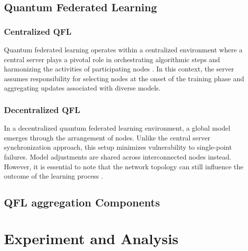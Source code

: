 \subsection{Quantum Federated Learning}
\subsubsection{Centralized QFL}
Quantum federated learning operates within a centralized environment where a central server plays a pivotal role in orchestrating algorithmic steps and harmonizing the activities of participating nodes \cite{pujahari2022quantum}. In this context, the server assumes responsibility for selecting nodes at the onset of the training phase and aggregating updates associated with diverse models.
\subsubsection{Decentralized QFL}

In a decentralized quantum federated learning environment, a global model emerges through the arrangement of nodes. Unlike the central server synchronization approach, this setup minimizes vulnerability to single-point failures. Model adjustments are shared across interconnected nodes instead. However, it is essential to note that the network topology can still influence the outcome of the learning process \cite{pujahari2022quantum}.
\subsection{QFL aggregation Components}

\section{Experiment and Analysis} \label{sec-experiment}

\begin{comment}
\begin{table}  \centering
  \caption{Precision Comparison on Event Detection Methods}
  \label{tbl:overall-experiments}
  \begin{tabular}{cccc}
\toprule
    & OR Event Detection & AC Event Detection & TC Event Detection \\
\midrule
    precision & 0.83 & 0.69 & 0.46 \\

\bottomrule
\end{tabular}
\end{table}
\end{comment}

